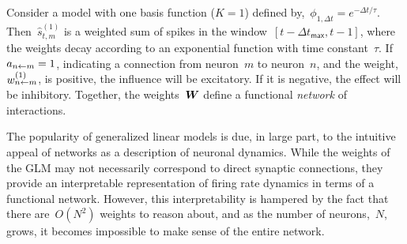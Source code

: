 Consider a model with one basis function ($K=1$) defined
by,~${\phi_{1,\Delta t} = e^{-\Delta t/\tau}}$.
Then~$\widehat{s}_{t,m}^{(1)}$ is a weighted sum of spikes in the
window~$[t-\Delta t_{\mathsf{max}},t-1]$, where the weights decay
according to an exponential function with time constant~$\tau$.  
If~${a_{n \leftarrow m}=1}$, indicating a
connection from neuron~$m$ to neuron~$n$, and
the weight,~$w_{n \leftarrow m}^{(1)}$, is positive, the influence will be
excitatory. If it is negative, the effect will be inhibitory.
Together, the weights~$\boldsymbol{W}$ define a functional \emph{network} of
interactions.

The popularity of generalized linear models is due, in large part, to
the intuitive appeal of networks as a description of neuronal
dynamics.  While the weights of the GLM may not necessarily correspond
to direct synaptic connections, they provide an interpretable
representation of firing rate dynamics in terms of a functional
network. However, this interpretability is hampered by the fact that
there are~$O(N^2)$ weights to reason about, and as the number of
neurons,~$N$, grows, it becomes impossible to make sense of the entire
network.

